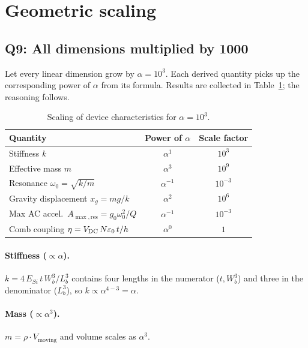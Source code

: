\section{Geometric scaling}

\subsection*{Q9: All dimensions multiplied by 1000}

Let every linear dimension grow by $\alpha=10^{3}$. Each derived quantity
picks up the corresponding power of $\alpha$ from its formula. Results are
collected in Table~\ref{tab:scaling}; the reasoning follows.

\begin{table}[H]
\centering
\small
\caption{Scaling of device characteristics for $\alpha=10^{3}$.}
\label{tab:scaling}
\begin{tabular}{l c c}
\toprule
\textbf{Quantity} & \textbf{Power of $\alpha$} & \textbf{Scale factor} \\
\midrule
Stiffness $k$              & $\alpha^{1}$  & $10^{3}$ \\
Effective mass $m$         & $\alpha^{3}$  & $10^{9}$ \\
Resonance $\omega_{0}=\sqrt{k/m}$ & $\alpha^{-1}$ & $10^{-3}$ \\
Gravity displacement $x_{g}=mg/k$ & $\alpha^{2}$  & $10^{6}$ \\
Max AC accel.\ $A_{\max,\mathrm{res}} = g_{0}\omega_{0}^{2}/Q$ & $\alpha^{-1}$ & $10^{-3}$ \\
Comb coupling $\eta = V_{\mathrm{DC}} \, N\varepsilon_{0}\,t/h$ & $\alpha^{0}$ & $1$ \\
\bottomrule
\end{tabular}
\end{table}

\paragraph{Stiffness ($\propto \alpha$).}
$k = 4\,E_{Si}\,t\,W_{b}^{3}/L_{b}^{3}$ contains four lengths in the
numerator ($t,W_{b}^{3}$) and three in the denominator ($L_{b}^{3}$), so
$k \propto \alpha^{4-3} = \alpha$.

\paragraph{Mass ($\propto \alpha^{3}$).} $m = \rho\cdot V_{\mathrm{moving}}$ and
volume scales as $\alpha^{3}$.

